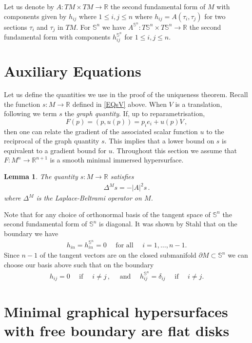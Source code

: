 \documentclass[10pt]{amsart}
\newcommand{\R}{\ensuremath{\mathbb{R}}}
\renewcommand{\S}{\ensuremath{\mathbb{S}}}
\newtheorem{lem}[thm]{Lemma}
\theoremstyle{remark}
\begin{document}
Let us denote by $A:T M\times T M \rightarrow \R$ the second fundamental form
of $M$ with components given by $h_{ij}$ where $1\leq i,j\leq n$ where $h_{ij}=
A(\tau_i,\tau_j)$ for two sections $\tau_i$ and $\tau_j$ in $TM$.
For $\S^n$ we have $A^{\S^n}:T \S^n \times T\S^n\rightarrow \R$ the
second fundamental form with components $h^{\S^n}_{ij}$ for $1\leq i,j\leq
n$.

\section{Auxiliary Equations}

Let us define the quantities we use in the proof of the uniqueness theorem.
Recall the function $s:M\rightarrow\R$ defined in \eqref{EQsV} above.
When $V$ is a translation, following \cite{ecker1989mce} we term $s$ the \emph{graph quantity}.
If, up to reparametrisation,
\[
F(p) = (p,u(p)) = p_ie_i + u(p)V\,,
\]
then one can relate the gradient of the associated scalar function $u$ to the
reciprocal of the graph quantity $s$. This implies that a lower bound on $s$
is equivalent to a gradient bound for $u$.
Throughout this section we assume that $F:M^n\rightarrow\R^{n+1}$ is a smooth
minimal immersed hypersurface.

\begin{lem} The quantity $s:M\rightarrow\R$
satisfies
\begin{align*}
{\Delta}^M s = - |A|^2 s\,.
\end{align*}
where $\Delta^M$ is the Laplace-Beltrami operator on $M$.
\label{sevolution}
\end{lem}

Note that for any choice of orthonormal basis of the tangent space of $\S^n$
the second fundamental form of $\S^n$ is diagonal.
It was shown by Stahl \cite{stahl1996convergence} that on the boundary we have
\begin{align*}
h_{in}=h^{\S^n}_{in}=0\quad \text{ for all }\quad i=1,\ldots,n-1.
\end{align*}
Since $n-1$ of the tangent vectors are on the closed submanifold $\partial M\subset\S^n$ we can choose
our basis above such that on the boundary
\begin{align*}
h_{ij}=0\quad  \text{ if } \quad i\neq j\,,\quad \text{ and }\quad h^{\S^n}_{ij}=\delta_{ij}\quad\text{ if }\quad i\neq j.
\end{align*}
\section{Minimal graphical hypersurfaces with free boundary are flat disks}
\label{KillingSection}
\end{document}
